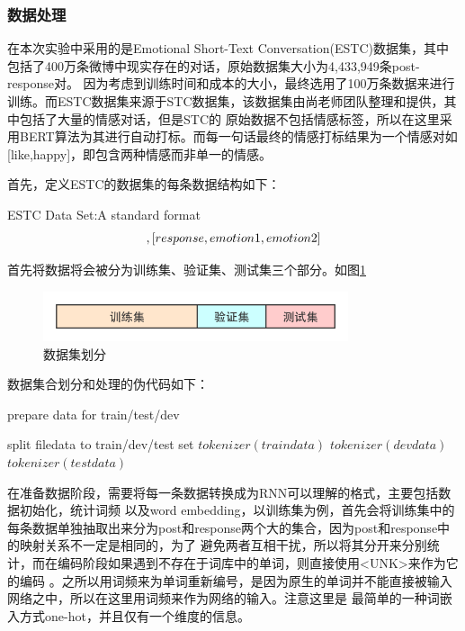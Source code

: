 \documentclass[supercite]{HustGraduPaper}
\theoremstyle{definition}
\begin{document}
\subsubsection{数据处理}
在本次实验中采用的是Emotional Short-Text Conversation(ESTC)数据集，其中包括了400万条微博中现实存在的对话，原始数据集大小为4,433,949条post-response对。
因为考虑到训练时间和成本的大小，最终选用了100万条数据来进行训练。而ESTC数据集来源于STC数据集，该数据集由尚老师团队整理和提供，其中包括了大量的情感对话，但是STC的
原始数据不包括情感标签，所以在这里采用BERT算法为其进行自动打标。而每一句话最终的情感打标结果为一个情感对如[like,happy]，即包含两种情感而非单一的情感。

首先，定义ESTC的数据集的每条数据结构如下：
\begin{shaded*}
    {ESTC Data Set:A standard format}
    \begin{align}
    [post, emotion 1, emotion 2],[response, emotion 1, emotion 2]\notag
    \end{align}
\end{shaded*}

首先将数据将会被分为训练集、验证集、测试集三个部分。如图\ref{Fig.data}
\begin{figure}[H] %
  \centering %
  \includegraphics[width=0.8\textwidth]{images/data.png} %
  \caption{数据集划分} %
  \label{Fig.data} %
\end{figure}
数据集合划分和处理的伪代码如下：
\begin{algorithm}
  \caption{prepare data for train/test/dev}
  \label{alg:ppd}
  \begin{algorithmic}
    \State split filedata to train/dev/test set
      \State $tokenizer(traindata)$
    \EndFor
      \State $tokenizer(devdata)$
    \EndFor
      \State $tokenizer(testdata)$
    \EndFor
  \end{algorithmic}
\end{algorithm}


在准备数据阶段，需要将每一条数据转换成为RNN可以理解的格式，主要包括数据初始化，统计词频
以及word embedding，以训练集为例，首先会将训练集中的每条数据单独抽取出来分为post和response两个大的集合，因为post和response中的映射关系不一定是相同的，为了
避免两者互相干扰，所以将其分开来分别统计，而在编码阶段如果遇到不存在于词库中的单词，则直接使用<UNK>来作为它的编码
。之所以用词频来为单词重新编号，是因为原生的单词并不能直接被输入网络之中，所以在这里用词频来作为网络的输入。注意这里是
最简单的一种词嵌入方式one-hot，并且仅有一个维度的信息。
\end{document}
